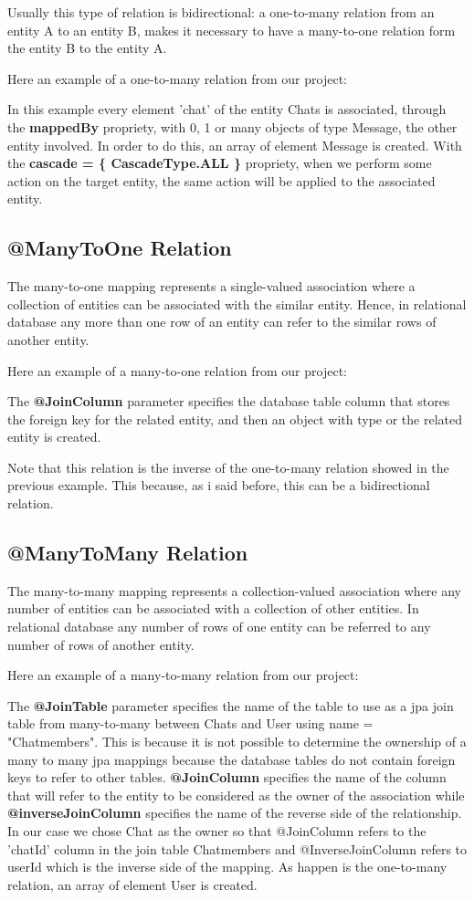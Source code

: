 \documentclass[a4paper]{article}
\begin{document}
Usually this type of relation is bidirectional: a one-to-many relation from an entity A to an entity B, makes it necessary to have a many-to-one relation form the entity B to the entity A.

Here an example of a one-to-many relation from our project:

In this example every element 'chat' of the entity Chats is associated, through the \textbf{mappedBy} propriety, with 0, 1 or many objects of type Message, the other entity involved. In order to do this, an array of element Message is created. With the \textbf{cascade = \{ CascadeType.ALL \}} propriety, when we perform some action on the target entity, the same action will be applied to the associated entity.

\subsection{@ManyToOne Relation}
The many-to-one mapping represents a single-valued association where a collection of entities can be associated with the similar entity. Hence, in relational database any more than one row of an entity can refer to the similar rows of another entity.

Here an example of a many-to-one relation from our project:

The \textbf{@JoinColumn} parameter specifies the database table column that stores the foreign key for the related entity, and then an object with type or the related entity is created.

Note that this relation is the inverse of the one-to-many relation showed in the previous example. This because, as i said before, this can be a bidirectional relation. 

\subsection{@ManyToMany Relation}
The many-to-many mapping represents a collection-valued association where any number of entities can be associated with a collection of other entities. In relational database any number of rows of one entity can be referred to any number of rows of another entity.

Here an example of a many-to-many relation from our project:

The \textbf{@JoinTable} parameter specifies the name of the table to use as a jpa join table from many-to-many between Chats and User using name = "Chatmembers". This is because it is not possible to determine the ownership of a many to many jpa mappings because the database tables do not contain foreign keys to refer to other tables. \textbf{@JoinColumn} specifies the name of the column that will refer to the entity to be considered as the owner of the association while \textbf{@inverseJoinColumn} specifies the name of the reverse side of the relationship. In our case we chose Chat as the owner so that @JoinColumn refers to the 'chatId' column in the join table Chatmembers and @InverseJoinColumn refers to userId which is the inverse side of the mapping. As happen is the one-to-many relation, an array of element User is created.
\end{document}
